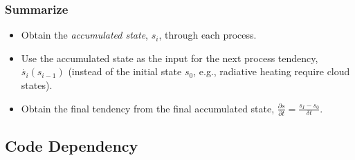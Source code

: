 \subsubsection{Summarize}
\begin{itemize}
    \item Obtain the \emph{accumulated state}, $s_i$, through each process.
    \item Use the accumulated state as the input for the next process tendency, $\dot{s_i}(s_{i-1})$ 
          (instead of the initial state $s_0$, e.g., radiative heating require cloud states).
    \item Obtain the final tendency from the final accumulated state, $\frac{\partial s}{\partial t} = \frac{s_I - s_0}{\delta t}$.
\end{itemize}



\subsection{Code Dependency}

